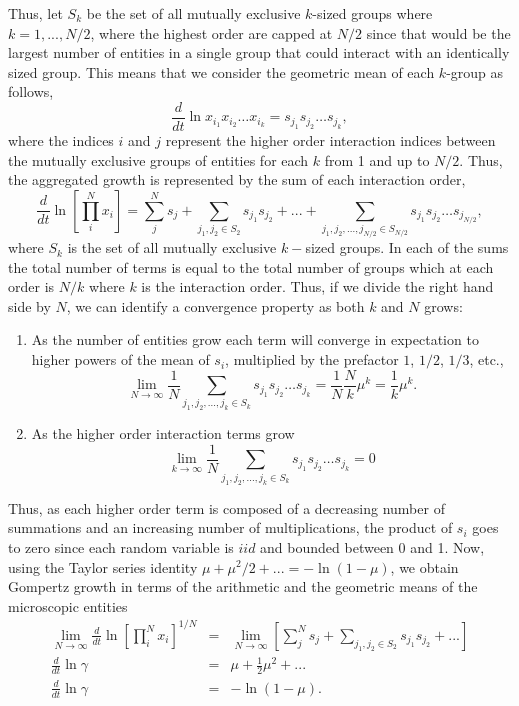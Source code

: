 \documentclass{article}
\begin{document}
Thus, let $S_k$ be the set of all mutually exclusive $k$-sized groups where $k=1,..., N/2$, where the highest order are capped at $N/2$ since that would be the largest number of entities in a single group that could interact with an identically sized group. This means that we consider the geometric mean of each $k$-group as follows,
\begin{equation}
\label{eq:modSIR4}
\frac{d}{dt} \ln x_{i_1} x_{i_2} \dots x_{i_k} = s_{j_1}s_{j_2}\dots s_{j_k}, 
\end{equation}
where the indices $i$ and $j$ represent the higher order interaction indices between the mutually exclusive groups of entities for each $k$ from 1 and up to $N/2$. Thus, the aggregated growth is represented by the sum of each interaction order,
\begin{equation}
\label{eq:MicroGomp0}
\frac{d}{dt} \ln \left[ \prod_i^N x_i \right ] = \sum_j^N s_{j} + \sum_{j_1, j_2 \in S_2} s_{j_1}s_{j_2} + ... + \sum_{j_1, j_2, ..., j_{N/2} \in S_{N/2}} s_{j_1}s_{j_2}\dots s_{j_{N/2}},
\end{equation}
where $S_k$ is the set of all mutually exclusive $k-$sized groups. In each of the sums the total number of terms is equal to the total number of groups which at each order is $N/k$ where $k$ is the interaction order. Thus, if we divide the right hand side by $N$, we can identify a convergence property as both $k$ and $N$ grows:
\begin{enumerate}
\item As the number of entities grow each term will converge in expectation to higher powers of the mean of $s_i$, multiplied by the prefactor $1$, $1/2$, $1/3$, etc., 
\begin{equation}
\label{eq:MicroGomp11}
\lim_{N\rightarrow \infty} \frac{1}{N}\sum_{j_1, j_2, ..., j_k \in S_k} s_{j_1}s_{j_2}\dots s_{j_k} = \frac{1}{N}\frac{N}{k} \mu^{k} = \frac{1}{k} \mu^{k}.
\end{equation}
\item As the higher order interaction terms grow
\begin{equation}
\label{eq:MicroGomp12}
\lim_{k\rightarrow \infty} \frac{1}{N}\sum_{j_1, j_2, ..., j_k \in S_k} s_{j_1}s_{j_2}\dots s_{j_k} = 0
\end{equation}
\end{enumerate}
Thus, as each higher order term is composed of a decreasing number of summations and an increasing number of multiplications, the product of $s_i$ goes to zero since each random variable is $iid$ and bounded between 0 and 1. 
Now, using the Taylor series identity $\mu+\mu^2/2+... = -\ln(1-\mu)$, we obtain Gompertz growth in terms of the arithmetic and the geometric means of the microscopic entities
\begin{eqnarray*}
\label{eq:MicroGomp13}
\lim_{N\rightarrow \infty}\frac{d}{dt} \ln \left[ \prod_i^N x_i \right ]^{1/N} &=&  \lim_{N\rightarrow \infty}\left[\sum_j^N s_{j} + \sum_{j_1, j_2 \in S_2} s_{j_1}s_{j_2} + ...\right]\\
\frac{d}{dt} \ln \gamma &=&  \mu + \frac{1}{2} \mu^2 + ...\\
\frac{d}{dt} \ln \gamma &=& - \ln (1-\mu).
\end{eqnarray*}
\end{document}
